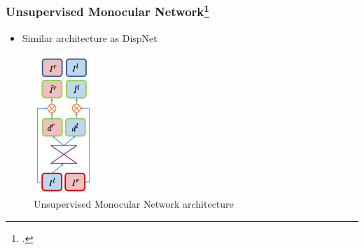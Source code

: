 \documentclass{beamer}
\begin{document}
\begin{frame}
\frametitle{Unsupervised Monocular Network\footcite{DBLP:journals/corr/GodardAB16}}
\center
\begin{itemize}
	\item Similar architecture as DispNet
\end{itemize}
\begin{figure}
    \centering
        \includegraphics[width=0.2\textwidth, height=0.5\textheight]{monodepth.png}
        \caption{Unsupervised Monocular Network architecture}
    \end{figure}
\end{frame}
\end{document}
